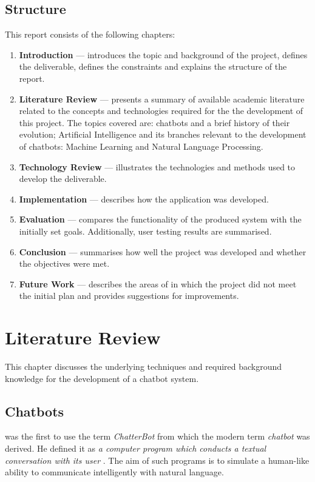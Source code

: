 \documentclass[12pt,a4paper]{article}
\begin{document}
\subsection{Structure}
This report consists of the following chapters:
\begin{enumerate}
	\item \textbf{Introduction} — introduces the topic and background of the project, defines the deliverable, defines the constraints and explains the structure of the report.
	\item \textbf{Literature Review} — presents a summary of available academic literature related to the concepts and technologies required for the the development of this project. The topics covered are: chatbots and a brief history of their evolution; Artificial Intelligence and its branches relevant to the development of chatbots: Machine Learning and Natural Language Processing.
	\item \textbf{Technology Review} — illustrates the technologies and methods used to develop the deliverable.
	\item \textbf{Implementation} — describes how the application was developed.
	\item \textbf{Evaluation} — compares the functionality of the produced system with the initially set goals. Additionally, user testing results are summarised.
	\item \textbf{Conclusion} — summarises how well the project was developed and whether the objectives were met.
	\item \textbf{Future Work} — describes the areas of in which the project did not meet the initial plan and provides suggestions for improvements. 
\end{enumerate}

\newpage
 \section{Literature Review}
This chapter discusses the underlying techniques and required background knowledge for the development of a chatbot system.

\subsection{Chatbots}
\citet{Mauldin1994} was the first to use the term \textit{ChatterBot} from which the modern term \textit{chatbot} was derived. He defined it as \textit{a computer program which conducts a textual conversation with its user} \citep{Mauldin1994}. The aim of such programs is to simulate a human-like ability to communicate intelligently with natural language. 
\end{document}
